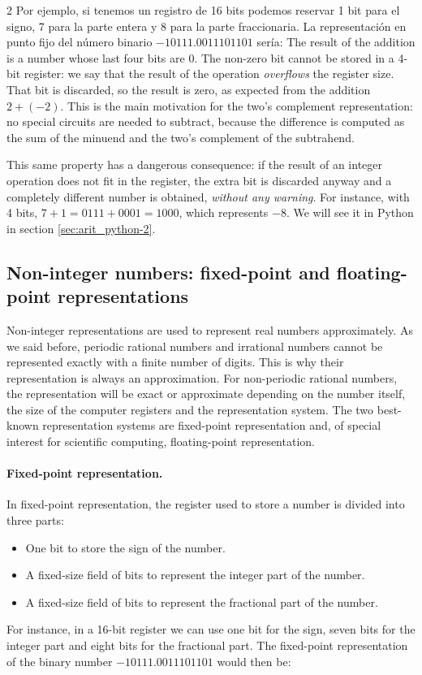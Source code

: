 \begin{paracol}{2}
Por ejemplo, si tenemos un registro de 16 bits podemos reservar 1 bit para el signo, 7 para la parte entera y 8 para la parte fraccionaria. La representación en punto fijo del número binario $-10111.0011101101$ sería:
\switchcolumn
The result of the addition is a number whose last four bits are 0. The non-zero bit cannot be stored in a 4-bit register: we say that the result of the operation \emph{overflows} the register size. That bit is discarded, so the result is zero, as expected from the addition $2+(-2)$. This is the main motivation for the two's complement representation: no special circuits are needed to subtract, because the difference is computed as the sum of the minuend and the two's complement of the subtrahend.

This same property has a dangerous consequence: if the result of an integer operation does not fit in the register, the extra bit is discarded anyway and a completely different number is obtained, \emph{without any warning}. For instance, with 4 bits, $7+1=0111+0001=1000$, which represents $-8$. We will see it in Python in section \ref{sec:arit_python-2}.

\subsection{Non-integer numbers: fixed-point and floating-point representations}
Non-integer representations are used to represent real numbers approximately. As we said before, periodic rational numbers and irrational numbers cannot be represented exactly with a finite number of digits. This is why their representation is always an approximation. For non-periodic rational numbers, the representation will be exact or approximate depending on the number itself, the size of the computer registers and the representation system. The two best-known representation systems are fixed-point representation and, of special interest for scientific computing, floating-point representation.

\paragraph{Fixed-point representation.} In fixed-point representation, the register used to store a number is divided into three parts:
\begin{itemize}
    \item One bit to store the sign of the number.
    \item A fixed-size field of bits to represent the integer part of the number.
    \item A fixed-size field of bits to represent the fractional part of the number.
 \end{itemize}
 For instance, in a 16-bit register we can use one bit for the sign, seven bits for the integer part and eight bits for the fractional part. The fixed-point representation of the binary number $-10111.0011101101$ would then be:
\end{paracol}
